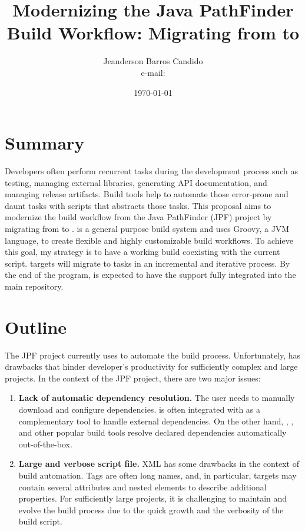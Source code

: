 \documentclass{article}
\author{Jeanderson Barros Candido\\ e-mail: \email{jeandersonbc@gmail.com}}
\title{Modernizing the Java PathFinder Build Workflow: Migrating from \ant{} to
\gradle{}}
\date{\today}
\begin{document}
\maketitle

\section{Summary}

Developers often perform recurrent tasks during the development process such as
testing, managing external libraries, generating API documentation, and
managing release artifacts.
Build tools help to automate those error-prone and daunt tasks with scripts
that abstracts those tasks.
This proposal aims to modernize the build workflow from the Java PathFinder
(JPF) project by migrating from \ant{} to \gradle{}.
\gradle{} is a general purpose build system and uses Groovy, a JVM language, to
create flexible and highly customizable build workflows.
To achieve this goal, my strategy is to have a working \gradle{} build
coexisting with the current \ant{} script.
\ant{} targets will migrate to \gradle{} tasks in an incremental and iterative
process.
By the end of the program, is expected to have the \gradle{} support fully
integrated into the main repository.

\section{Outline}
\label{sec:intro}

The JPF project currently uses \ant{} to automate the build process.
Unfortunately, \ant{} has drawbacks that hinder developer's productivity for
sufficiently complex and large projects.
In the context of the JPF project, there are two major issues:

\begin{enumerate}

\item \textbf{Lack of automatic dependency resolution.}
The user needs to manually download and configure dependencies.
\ant{} is often integrated with \ivy{}\cite{page:ivy} as a complementary
tool to handle external dependencies.
On the other hand, \gradle{}\cite{page:gradle}, \maven{}\cite{page:maven},
and other popular build tools resolve declared dependencies automatically
out-of-the-box.

\item \textbf{Large and verbose script file.}
XML has some drawbacks in the context of build automation.
Tags are often long names, and, in particular, \ant{} targets may
contain several attributes and nested elements to describe additional
properties.
For sufficiently large projects, it is challenging to maintain and evolve the
build process due to the quick growth and the verbosity of the build script.

\end{enumerate}
\end{document}
